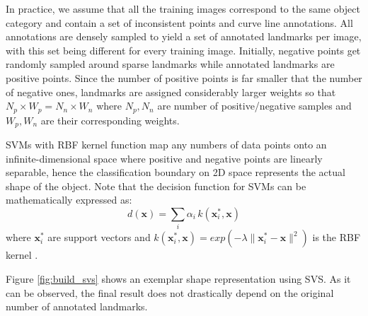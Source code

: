 In practice, we assume that all the training images correspond to the same object category and contain a set of inconsistent points and curve line annotations. All annotations are densely sampled to yield a set of annotated landmarks per image, with this set being different for every training image. Initially, negative points get randomly sampled around sparse landmarks while annotated landmarks are positive points. Since the number of positive points is far smaller that the number of negative ones, landmarks are assigned considerably larger weights so that $N_p \times W_p=N_n \times W_n$ where $N_p, N_n$ are number of positive/negative samples and $W_p, W_n$ are their corresponding weights.

SVMs with RBF kernel function map any numbers of data points onto an infinite-dimensional space where positive and negative points are linearly separable, hence the classification boundary on 2D space represents the actual shape of the object. Note that the decision function for SVMs can be mathematically expressed as:
\begin{equation} \label{eq:decisionfunc}
    d(\mathbf{x})=\sum_i\alpha_i \, k(\mathbf{x}_i^*,\mathbf{x})
\end{equation}
where $\mathbf{x}_i^*$ are support vectors and \mbox{$k(\mathbf{x}_i^*, \mathbf{x}) = exp(-\lambda \|\mathbf{x}_i^* -\mathbf{x}\|^2)$} is the RBF kernel .

Figure \ref{fig:build_svs} shows an exemplar shape representation using SVS. As it can be observed, the final result does not drastically depend on the original number of annotated landmarks.


